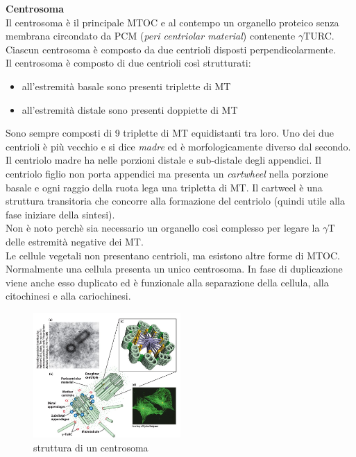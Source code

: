                \textbf{Centrosoma}\\
                Il centrosoma è il principale MTOC e al contempo un organello proteico senza membrana circondato da PCM (\textit{peri centriolar material}) contenente $\gamma$TURC. Ciascun centrosoma è composto da due centrioli disposti perpendicolarmente.\\
                Il centrosoma è composto di due centrioli così strutturati:
                \begin{itemize}
                    \item all'estremità basale sono presenti triplette di MT
                    \item all'estremità distale sono presenti doppiette di MT
                \end{itemize}
                Sono sempre composti di 9 triplette di MT equidistanti tra loro. Uno dei due centrioli è più vecchio e si dice \textit{madre} ed è morfologicamente diverso dal secondo. 
                Il centriolo madre ha nelle porzioni distale e sub-distale degli appendici. Il centriolo figlio non porta appendici ma presenta un \textit{cartwheel} nella porzione basale e ogni raggio della ruota lega una tripletta di MT. Il cartweel è una struttura transitoria che concorre alla formazione del centriolo (quindi utile alla fase iniziare della sintesi).\\
                Non è noto perchè sia necessario un organello così complesso per legare la $\gamma$T delle estremità negative dei MT.\\
                Le cellule vegetali non presentano centrioli, ma esistono altre forme di MTOC.\\
                Normalmente una cellula presenta un unico centrosoma. In fase di duplicazione viene anche esso duplicato ed è funzionale alla separazione della cellula, alla citochinesi e alla cariochinesi.
                \begin{figure}[h]
                    \centering
                    \includegraphics[width=0.5\textwidth]{images/centrosoma.JPG}
                    \caption{\small struttura di un centrosoma} 
                    \label{fig:mesh1}
                \end{figure}\\
